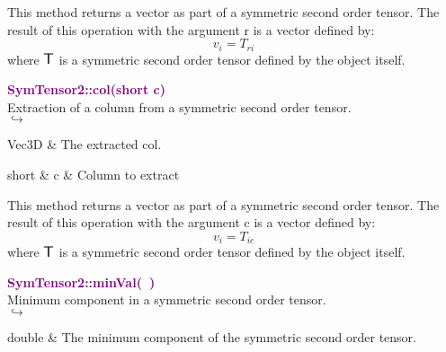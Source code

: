 This method returns a vector as part of a symmetric second order tensor.
The result of this operation with the argument r is a vector defined by:
\begin{equation*}
v_{i} = T_{ri}
\end{equation*}
where $\mbox{\large\ensuremath{\mathsf{T}}}$ is a symmetric second order tensor defined by the object itself.

\textcolor{purple}{\textbf{SymTensor2::col(short c)}}\label{SymTensor2::col(short c)}\\
Extraction of a column from a symmetric second order tensor.\\ \hspace*{5mm}$\hookrightarrow$
\vspace*{-2em}\begin{tcolorbox}[grow to left by=-1cm, width=\textwidth-1cm,myArgs,tabularx={l|R}]
Vec3D & The extracted col.
\end{tcolorbox}

\begin{tcolorbox}[width=\textwidth,myArgs,tabularx={ll|R}]
short & c & Column to extract
\end{tcolorbox}

This method returns a vector as part of a symmetric second order tensor.
The result of this operation with the argument c is a vector defined by:
\begin{equation*}
v_{i} = T_{ic}
\end{equation*}
where $\mbox{\large\ensuremath{\mathsf{T}}}$ is a symmetric second order tensor defined by the object itself.

\textcolor{purple}{\textbf{SymTensor2::minVal(~)}}\label{SymTensor2::minVal()}\\
Minimum component in a symmetric second order tensor.\\ \hspace*{5mm}$\hookrightarrow$
\vspace*{-2em}\begin{tcolorbox}[grow to left by=-1cm, width=\textwidth-1cm,myArgs,tabularx={l|R}]
double & The minimum component of the symmetric second order tensor.
\end{tcolorbox}

